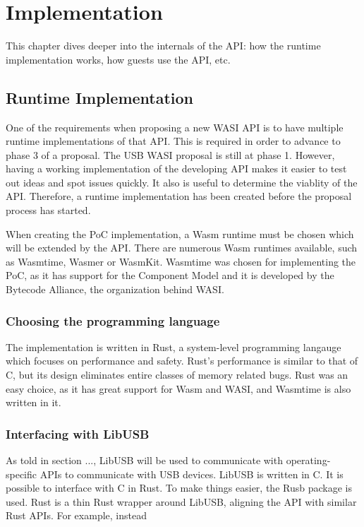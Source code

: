 \chapter{Implementation}
This chapter dives deeper into the internals of the API: how the runtime implementation works, how guests use the API, etc.

\section{Runtime Implementation}
One of the requirements when proposing a new \acrshort{WASI} \acrshort{API} is to have multiple runtime implementations of that \acrshort{API}. This is required in order to advance to phase 3 of a proposal. The \acrshort{USB} \acrshort{WASI} proposal is still at phase 1. However, having a working implementation of the developing \acrshort{API} makes it easier to test out ideas and spot issues quickly. It also is useful to determine the viablity of the \acrshort{API}. Therefore, a runtime implementation has been created before the proposal process has started.

When creating the \acrshort{PoC} implementation, a \acrshort{Wasm} runtime must be chosen which will be extended by the \acrshort{API}. There are numerous \acrshort{Wasm} runtimes available, such as Wasmtime, Wasmer or WasmKit. Wasmtime was chosen for implementing the \acrshort{PoC}, as it has support for the Component Model and it is developed by the Bytecode Alliance, the organization behind \acrshort{WASI}.

\subsection{Choosing the programming language}
The implementation is written in Rust, a system-level programming langauge which focuses on performance and safety. Rust's performance is similar to that of C, but its design eliminates entire classes of memory related bugs. Rust was an easy choice, as it has great support for \acrshort{Wasm} and \acrshort{WASI}, and Wasmtime is also written in it.

\subsection{Interfacing with LibUSB}
As told in section ..., LibUSB will be used to communicate with operating-specific APIs to communicate with USB devices. LibUSB is written in C. It is possible to interface with C in Rust. To make things easier, the Rusb package is used. Rust is a thin Rust wrapper around LibUSB, aligning the API with similar Rust APIs. For example, instead  